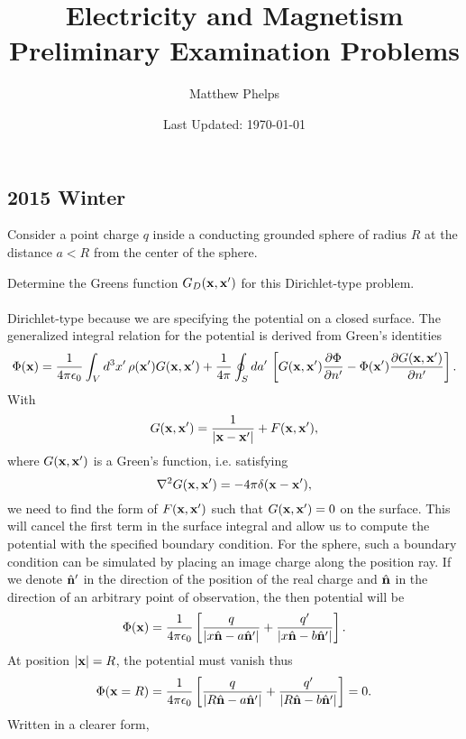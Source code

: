 \documentclass[11pt,letterpaper]{article}
\title{Electricity and Magnetism Preliminary Examination Problems}
\author{Matthew Phelps}
\date{Last Updated: \today}
\begin{document}
\maketitle

\subsection*{2015 Winter}
\phantom{}
	\benum
		\item
		Consider a point charge $q$ inside a conducting grounded sphere of radius $R$ at the distance $a<R$ from the center of the
		sphere.
		
		\benum
			\item
			Determine the Greens function $G_D(\vect x,\vect x')$ for this Dirichlet-type problem. 
			\\
			\\
			Dirichlet-type because we are specifying the potential on a closed surface. The generalized integral relation for the potential
			is derived from Green's identities 
			\[
				\Phi(\vect x) = \frac{1}{4\pi\epo}\int_Vd^3x'\, \rho(\vect x')G(\vect x,\vect x') + \frac{1}{4\pi}\oint_S da'\, 
				\blr{G(\vect x,\vect x')\pdiff[\Phi]{n'}-\Phi(\vect x')\pdiff[G(\vect x,\vect x')]{n'}}.
			\]
			With 
			\[
				G(\vect x,\vect x') = \frac{1}{|\vect x-\vect x'|}+F(\vect x,\vect x'),
			\] 
			where $G(\vect x,\vect x')$ is a Green's function, i.e. satisfying
			\[
				\del^2G(\vect x,\vect x') = -4\pi\delta(\vect x-\vect x'),
			\]
			we need to find the form of $F(\vect x,\vect x')$ such that $G(\vect x,\vect x') = 0$ on the surface. This will cancel the
			first term in the surface integral and allow us to compute the potential with the specified boundary condition. For the sphere,
			such a boundary condition can be simulated by placing an image charge along the position ray. If we denote $\vecth n'$ in the 
			direction of the position of the real charge and $\vecth n$ in the direction of an arbitrary point of observation, the then potential
			will be
			\[
				\Phi(\vect x) = \frac{1}{4\pi\epo}\blr{\frac{q}{|x\vecth n-a\vecth n'|}+\frac{q'}{|x\vecth n - b\vecth n'|}}.
			\]
			At position $|\vect x| = R$, the potential must vanish thus
			\[
				\Phi(\vect x = R) = \frac{1}{4\pi\epo}\blr{\frac{q}{|R\vecth n-a\vecth n'|}+\frac{q'}{|R\vecth n - b\vecth n'|}} = 0.
			\]
			Written in a clearer form,
\end{document}
